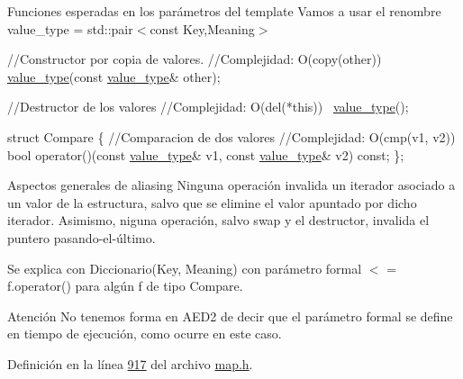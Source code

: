 \begin{DoxyParagraph}{Funciones esperadas en los parámetros del template}
Vamos a usar el renombre value\+\_\+type = std\+::pair$<$const Key,\+Meaning$>$


\begin{DoxyCode}
\textcolor{comment}{//Constructor por copia de valores.}
\textcolor{comment}{//Complejidad: O(copy(other))}
\hyperlink{classaed2_1_1map_a719db98e0ff9a837610f76be33264680_a719db98e0ff9a837610f76be33264680}{value\_type}(\textcolor{keyword}{const} \hyperlink{classaed2_1_1map_a719db98e0ff9a837610f76be33264680_a719db98e0ff9a837610f76be33264680}{value\_type}& other);

\textcolor{comment}{//Destructor de los valores}
\textcolor{comment}{//Complejidad: O(del(*this))}
~\hyperlink{classaed2_1_1map_a719db98e0ff9a837610f76be33264680_a719db98e0ff9a837610f76be33264680}{value\_type}();

\textcolor{keyword}{struct }Compare \{
  \textcolor{comment}{//Comparacion de dos valores}
  \textcolor{comment}{//Complejidad: O(cmp(v1, v2))}
  \textcolor{keywordtype}{bool} operator()(\textcolor{keyword}{const} \hyperlink{classaed2_1_1map_a719db98e0ff9a837610f76be33264680_a719db98e0ff9a837610f76be33264680}{value\_type}& v1, \textcolor{keyword}{const} \hyperlink{classaed2_1_1map_a719db98e0ff9a837610f76be33264680_a719db98e0ff9a837610f76be33264680}{value\_type}& v2) \textcolor{keyword}{const};
\};
\end{DoxyCode}
 
\end{DoxyParagraph}


\begin{DoxyParagraph}{Aspectos generales de aliasing}
Ninguna operación invalida un iterador asociado a un valor de la estructura, salvo que se elimine el valor apuntado por dicho iterador. Asimismo, niguna operación, salvo swap y el destructor, invalida el puntero pasando-\/el-\/último.
\end{DoxyParagraph}
\begin{DoxyParagraph}{Se explica con}
Diccionario(Key, Meaning) con parámetro formal $<$ = f.\+operator() para algún f de tipo Compare.
\end{DoxyParagraph}
\begin{DoxyAttention}{Atención}
No tenemos forma en A\+E\+D2 de decir que el parámetro formal se define en tiempo de ejecución, como ocurre en este caso. 
\end{DoxyAttention}


Definición en la línea \hyperlink{map_8h_source_l00917}{917} del archivo \hyperlink{map_8h_source}{map.\+h}.



